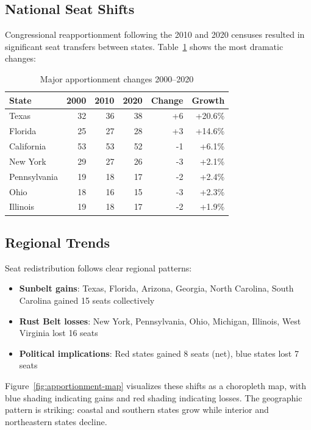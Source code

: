 
\subsection{National Seat Shifts}

Congressional reapportionment following the 2010 and 2020 censuses resulted in significant seat transfers between states. Table~\ref{tab:apportionment} shows the most dramatic changes:

\begin{table}[h]
\centering
\begin{tabular}{lrrrrr}
\toprule
\textbf{State} & \textbf{2000} & \textbf{2010} & \textbf{2020} & \textbf{Change} & \textbf{Growth} \\
\midrule
Texas        & 32 & 36 & 38 & +6 & +20.6\% \\
Florida      & 25 & 27 & 28 & +3 & +14.6\% \\
California   & 53 & 53 & 52 & -1 & +6.1\% \\
New York     & 29 & 27 & 26 & -3 & +2.1\% \\
Pennsylvania & 19 & 18 & 17 & -2 & +2.4\% \\
Ohio         & 18 & 16 & 15 & -3 & +2.3\% \\
Illinois     & 19 & 18 & 17 & -2 & +1.9\% \\
\bottomrule
\end{tabular}
\caption{Major apportionment changes 2000--2020}
\label{tab:apportionment}
\end{table}

\subsection{Regional Trends}

Seat redistribution follows clear regional patterns:

\begin{itemize}
    \item \textbf{Sunbelt gains}: Texas, Florida, Arizona, Georgia, North Carolina, South Carolina gained 15 seats collectively
    \item \textbf{Rust Belt losses}: New York, Pennsylvania, Ohio, Michigan, Illinois, West Virginia lost 16 seats
    \item \textbf{Political implications}: Red states gained 8 seats (net), blue states lost 7 seats
\end{itemize}

Figure~\ref{fig:apportionment-map} visualizes these shifts as a choropleth map, with blue shading indicating gains and red shading indicating losses. The geographic pattern is striking: coastal and southern states grow while interior and northeastern states decline.

